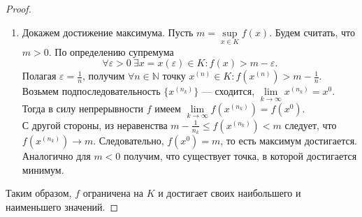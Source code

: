 \documentclass[12pt,a4paper]{report}
\begin{document}
\begin{proof}
\begin{enumerate}
        Получили противоречие. Следовательно, $|m|<\infty$, то есть $f$ ограничена.

        \item Докажем достижение максимума. Пусть $m=\sup\limits_{x\in K} f(x)$. Будем считать, что $m>0$. По определению супремума
        \[
        \forall \varepsilon>0\ \exists x=x(\varepsilon)\in K\colon f(x)>m-\varepsilon.
        \]
        Полагая $\varepsilon=\frac1n$, получим $\forall n\in\mathbb N$ точку $x^{(n)}\in K \colon f(x^{(n)})>m-\frac1n$. \\
        
        Возьмем подпоследовательность $\{x^{(n_k)}\}$ --- сходится, $\lim\limits_{k\to\infty} x^{(n_k)}=x^0$. Тогда в силу непрерывности $f$ имеем $\lim\limits_{k\to\infty} f(x^{(n_k)})=f(x^0)$. \\
        С другой стороны, из неравенства $m-\frac{1}{n_k}\le f(x^{(n_k)})<m$ следует, что $f(x^{(n_k)})\to m$. Следовательно, $f(x^0)=m$, то есть максимум достигается. \\

        Аналогично для $m<0$ получим, что существует точка, в которой достигается минимум.
    \end{enumerate}
    
    Таким образом, $f$ ограничена на $K$ и достигает своих наибольшего и наименьшего значений.
\end{proof}

\end{document}
